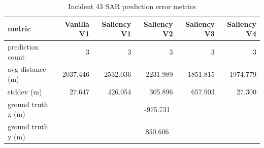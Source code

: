 \begin{table}[ht]
\centering
\caption{Incident 43 SAR prediction error metrics}
\label{tab:sar-incident-43}
\begin{tabular}{lrrrrr}
\hline
metric & Vanilla V1 & Saliency V1 & Saliency V2 & Saliency V3 & Saliency V4 \\
\hline
prediction count & 3 & 3 & 3 & 3 & 3 \\
avg distance (m) & 2037.446 & 2532.036 & 2231.989 & 1851.815 & 1974.779 \\
stddev (m) & 27.647 & 426.054 & 305.896 & 657.903 & 27.300 \\
ground truth x (m) & \multicolumn{5}{c}{-975.731} \\
ground truth y (m) & \multicolumn{5}{c}{850.606} \\
\hline
\end{tabular}
\end{table}

